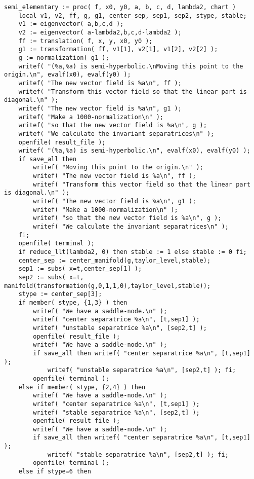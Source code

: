 \documentclass[a4paper,10pt]{article}
\begin{document}
\begin{lstlisting}[name=type]
semi_elementary := proc( f, x0, y0, a, b, c, d, lambda2, chart )
    local v1, v2, ff, g, g1, center_sep, sep1, sep2, stype, stable;
    v1 := eigenvector( a,b,c,d );
    v2 := eigenvector( a-lambda2,b,c,d-lambda2 );
    ff := translation( f, x, y, x0, y0 );
    g1 := transformation( ff, v1[1], v2[1], v1[2], v2[2] );
    g := normalization( g1 );
    writef( "(%a,%a) is semi-hyperbolic.\nMoving this point to the origin.\n", evalf(x0), evalf(y0) );
    writef( "The new vector field is %a\n", ff );
    writef( "Transform this vector field so that the linear part is diagonal.\n" );
    writef( "The new vector field is %a\n", g1 );
    writef( "Make a 1000-normalization\n" );
    writef( "so that the new vector field is %a\n", g );
    writef( "We calculate the invariant separatrices\n" );
    openfile( result_file );
    writef( "(%a,%a) is semi-hyperbolic.\n", evalf(x0), evalf(y0) );
    if save_all then
        writef( "Moving this point to the origin.\n" );
        writef( "The new vector field is %a\n", ff );
        writef( "Transform this vector field so that the linear part is diagonal.\n" );
        writef( "The new vector field is %a\n", g1 );
        writef( "Make a 1000-normalization\n" );
        writef( "so that the new vector field is %a\n", g );
        writef( "We calculate the invariant separatrices\n" );
    fi;
    openfile( terminal );
    if reduce_llt(lambda2, 0) then stable := 1 else stable := 0 fi;
    center_sep := center_manifold(g,taylor_level,stable);
    sep1 := subs( x=t,center_sep[1] );
    sep2 := subs( x=t, manifold(transformation(g,0,1,1,0),taylor_level,stable));
    stype := center_sep[3];
    if member( stype, {1,3} ) then
        writef( "We have a saddle-node.\n" );
        writef( "center separatrice %a\n", [t,sep1] );
        writef( "unstable separatrice %a\n", [sep2,t] );
        openfile( result_file );
        writef( "We have a saddle-node.\n" );
        if save_all then writef( "center separatrice %a\n", [t,sep1] );
            writef( "unstable separatrice %a\n", [sep2,t] ); fi;
        openfile( terminal );
    else if member( stype, {2,4} ) then
        writef( "We have a saddle-node.\n" );
        writef( "center separatrice %a\n", [t,sep1] );
        writef( "stable separatrice %a\n", [sep2,t] );
        openfile( result_file );
        writef( "We have a saddle-node.\n" );
        if save_all then writef( "center separatrice %a\n", [t,sep1] );
            writef( "stable separatrice %a\n", [sep2,t] ); fi;
        openfile( terminal );
    else if stype=6 then

\end{lstlisting}
\end{document}
